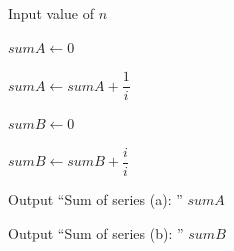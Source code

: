 \begin{algorithm}
\caption{Calculate Sum of Two Series}
\begin{algorithmic}[1]

\STATE Input value of $n$

\STATE $sumA \gets 0$

    \STATE $sumA \gets sumA + \dfrac{1}{i}$
\ENDFOR

\STATE $sumB \gets 0$

    \STATE $sumB \gets sumB + \dfrac{i}{i}$
\ENDFOR

\STATE Output ``Sum of series (a): '' $sumA$

\STATE Output ``Sum of series (b): '' $sumB$

\end{algorithmic}
\end{algorithm}